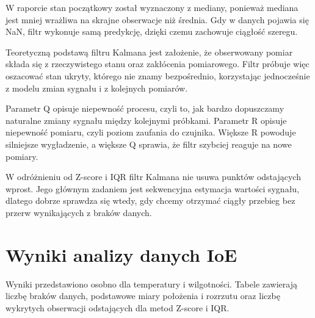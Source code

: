 \documentclass[12pt,twoside]{article}
\begin{document}
W raporcie stan początkowy
został wyznaczony z mediany, ponieważ mediana jest mniej wrażliwa
na skrajne obserwacje niż średnia. Gdy w danych pojawia się NaN,
filtr wykonuje samą predykcję, dzięki czemu zachowuje ciągłość
szeregu.


Teoretyczną podstawą filtru
Kalmana jest założenie, że obserwowany pomiar składa się z
rzeczywistego stanu oraz zakłócenia pomiarowego. Filtr próbuje
więc oszacować stan ukryty, którego nie znamy bezpośrednio,
korzystając jednocześnie z modelu zmian sygnału i z kolejnych
pomiarów.


Parametr Q opisuje niepewność
procesu, czyli to, jak bardzo dopuszczamy naturalne zmiany sygnału
między kolejnymi próbkami. Parametr R opisuje niepewność pomiaru,
czyli poziom zaufania do czujnika. Większe R powoduje silniejsze
wygładzenie, a większe Q sprawia, że filtr szybciej reaguje na
nowe pomiary.


W odróżnieniu od Z-score i
IQR filtr Kalmana nie usuwa punktów odstających wprost. Jego
głównym zadaniem jest sekwencyjna estymacja wartości sygnału,
dlatego dobrze sprawdza się wtedy, gdy chcemy otrzymać ciągły
przebieg bez przerw wynikających z braków danych.

\section{Wyniki analizy danych IoE}

Wyniki przedstawiono osobno dla temperatury i
wilgotności. Tabele zawierają liczbę braków danych, podstawowe
miary położenia i rozrzutu oraz liczbę wykrytych obserwacji
odstających dla metod Z-score i IQR.
\end{document}
